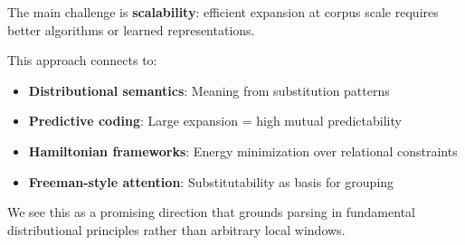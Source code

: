 \documentclass[11pt]{article}
\begin{document}
The main challenge is \textbf{scalability}: efficient expansion at corpus scale requires better algorithms or learned representations.

This approach connects to:
\begin{itemize}
\item \textbf{Distributional semantics}: Meaning from substitution patterns
\item \textbf{Predictive coding}: Large expansion = high mutual predictability
\item \textbf{Hamiltonian frameworks}: Energy minimization over relational constraints
\item \textbf{Freeman-style attention}: Substitutability as basis for grouping
\end{itemize}

We see this as a promising direction that grounds parsing in fundamental distributional principles rather than arbitrary local windows.
\end{document}
